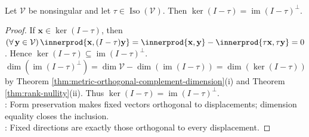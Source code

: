 \begin{proposition} \label{prop:isometry-fixed-space} \\
Let $\mathcal{V}$ be nonsingular and let $\tau\in\operatorname{Iso}(\mathcal{V})$. Then $\ker(I-\tau)=\operatorname{im}(I-\tau)^{\perp}$.
\begin{proof}
If $\mathbf{x}\in\ker(I-\tau)$, then $(\forall\,\mathbf{y}\in\mathcal{V})\,\innerprod{\mathbf{x},(I-\tau)\mathbf{y}}=\innerprod{\mathbf{x},\mathbf{y}}-\innerprod{\tau\mathbf{x},\tau\mathbf{y}}=0$. Hence $\ker(I-\tau)\subseteq\operatorname{im}(I-\tau)^{\perp}$.\\
$\dim(\operatorname{im}(I-\tau)^{\perp})=\dim\mathcal{V}-\dim(\operatorname{im}(I-\tau))=\dim(\ker(I-\tau))$ by Theorem \ref{thm:metric-orthogonal-complement-dimension}(i) and Theorem \ref{thm:rank-nullity}(ii). Thus $\ker(I-\tau)=\operatorname{im}(I-\tau)^{\perp}$.\\
: Form preservation makes fixed vectors orthogonal to displacements; dimension equality closes the inclusion.\\
: Fixed directions are exactly those orthogonal to every displacement.
\end{proof}
\end{proposition}

